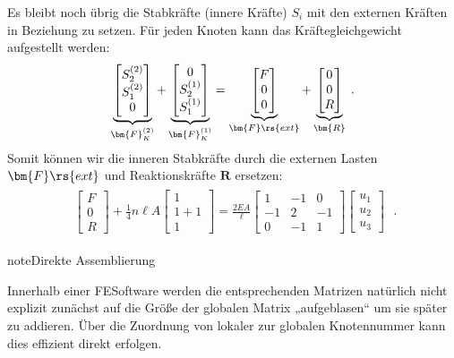 \documentclass[letterpaper,10pt,german]{jupyterBook}
\begin{document}
\sphinxAtStartPar
Es bleibt noch übrig die Stabkräfte (innere Kräfte) \(S_i\) mit den externen Kräften in Beziehung zu setzen. Für jeden Knoten kann das Kräftegleichgewicht aufgestellt werden:
\begin{equation}\label{equation:chapters/chapter2/1dFEM:stabFEM8}
\begin{split}\underbrace{\begin{bmatrix}
S_2^{(2)} \\
S_1^{(2)} \\
0
\end{bmatrix}}_{\bm{F}_K^{(2)}} + \underbrace{\begin{bmatrix}
0 \\
S_2^{(1)} \\
S_1^{(1)}
\end{bmatrix}}_{\bm{F}_K^{(1)}} = \underbrace{\begin{bmatrix}
F \\
0 \\
0
\end{bmatrix}}_{\bm{F}\rs{ext}} + \underbrace{\begin{bmatrix}
0 \\
0 \\
R
\end{bmatrix}}_{\bm{R}} \;.\end{split}
\end{equation}
\sphinxAtStartPar
Somit können wir die inneren Stabkräfte durch die externen Lasten \(\bm{F}\rs{ext}\) und Reaktionskräfte \(\bm{R}\) ersetzen:
\begin{equation}\label{equation:chapters/chapter2/1dFEM:stabFEM9}
\begin{split}\begin{align}
\begin{bmatrix}
F \\
0 \\
R
\end{bmatrix} + \frac{1}{4}n\ell A \begin{bmatrix}
1 \\
1+1\\
1
\end{bmatrix} = \frac{2EA}{\ell}\begin{bmatrix}
1 & -1 & 0\\
-1 & 2 & -1\\
0 & -1 & 1
\end{bmatrix} \begin{bmatrix}
u_1 \\
u_2\\
u_3
\end{bmatrix}
\end{align} \; .\end{split}
\end{equation}
\begin{sphinxadmonition}{note}{Direkte Assemblierung}

\sphinxAtStartPar
Innerhalb einer FE\sphinxhyphen{}Software werden die entsprechenden Matrizen natürlich nicht explizit zunächst auf die Größe der globalen Matrix „aufgeblasen“ um sie später zu addieren. Über die Zuordnung von lokaler zur globalen Knotennummer kann dies effizient direkt erfolgen.
\end{sphinxadmonition}
\end{document}
